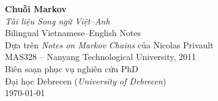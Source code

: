 \documentclass[12pt,a4paper]{book}
\theoremstyle{vnthm}
\theoremstyle{vndef}
\theoremstyle{vnplain}
\begin{document}
\begin{titlepage}
\centering
\vspace*{3cm}
{\Huge\bfseries Chuỗi Markov\\[0.5cm]}
{\Large\itshape Tài liệu Song ngữ Việt--Anh\\[0.3cm]}
{\large Bilingual Vietnamese--English Notes\\[2cm]}
{\large Dựa trên \textit{Notes on Markov Chains} của Nicolas Privault\\[0.5cm]}
{\normalsize MAS328 -- Nanyang Technological University, 2011\\[3cm]}
{\normalsize Biên soạn phục vụ nghiên cứu PhD\\
Đại học Debrecen (\textit{University of Debrecen})\\[1cm]}
\today
\end{titlepage}

\tableofcontents
\newpage








\appendix

\end{document}
